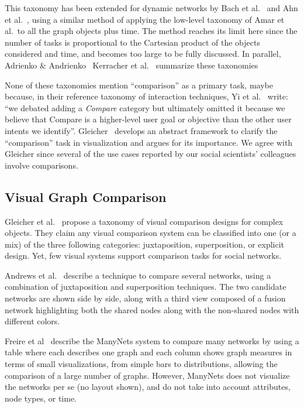 This taxonomy has been extended for dynamic networks by Bach et al.~\cite{bach:hal-00906597} and Ahn et al.~\cite{Ahn14}, using a similar method of applying the low-level taxonomy of Amar et al.\ to all the graph objects plus time. The method reaches its limit here since the number of tasks is proportional to the Cartesian product of the objects considered and time, and becomes too large to be fully discussed.
In parallel, Adrienko \& Andrienko~\cite{andrienko2006exploratory}
Kerracher et al.~\cite{Kerracher15} summarize these taxonomies 

None of these taxonomies mention ``comparison'' as a primary task, maybe because, in their reference taxonomy of interaction techniques, Yi et al.~\cite{yiDeeperUnderstandingRole2007} write: ``we debated adding a \emph{Compare} category but ultimately
omitted it because we believe that Compare is a higher-level user goal or objective than the other user intents we identify''. Gleicher~\cite{Gleicher18, gleicherVisualComparisonInformation2011} develops an abstract framework to clarify the ``comparison'' task in visualization and argues for its importance.
We agree with Gleicher since several of the use cases reported by our social scientists' colleagues involve comparisons.
\fi

\subsection{Visual Graph Comparison}

Gleicher et al.~\cite{Gleicher18} propose a taxonomy of visual comparison designs for complex objects. They claim any visual comparison system can be classified into one (or a mix) of the three following categories: juxtaposition, superposition, or explicit design.
Yet, few visual systems support comparison tasks for social networks.

Andrews et al.~\cite{andrewsVisualGraphComparison2009} describe a technique to compare several networks, using a combination of juxtaposition and superposition techniques.
The two candidate networks are shown side by side, along with a third view composed of a fusion network highlighting both the shared nodes along with the non-shared nodes with different colors.

Freire et al~\cite{ManyNets} describe the ManyNets system to compare many networks by using a table where each describes one graph and each column shows graph measures in terms of small visualizations, from simple bars to distributions, allowing the comparison of a large number of graphs. However, ManyNets does not visualize the networks per se (no layout shown), and do not take into account attributes, node types, or time.

